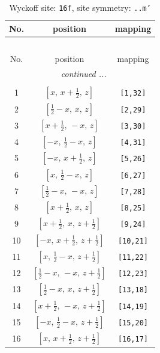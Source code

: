 \documentclass[fleqn,8pt]{jsarticle}
\begin{document}
\renewcommand{\arraystretch}{1.2}
\begin{longtable}{ccc}
\caption{Wyckoff site: {\tt 16f}, site symmetry: {\tt ..m'}}
 \\
 \hline \hline
No. & position & mapping \\ \hline \endfirsthead

\multicolumn{2}{l}{\tablename\ \thetable{}} \\
 \hline \hline
No. & position & mapping \\ \hline \endhead

 \hline \hline
\multicolumn{2}{r}{\footnotesize\it continued ...} \\ \endfoot

 \hline \hline
\multicolumn{2}{r}{} \\ \endlastfoot

1 & $\left[ x,\, x + \frac{1}{2},\, z \right]$ & {\tt [1,32]} \\ \hline
2 & $\left[ \frac{1}{2} - x,\, x,\, z \right]$ & {\tt [2,29]} \\ \hline
3 & $\left[ x + \frac{1}{2},\, - x,\, z \right]$ & {\tt [3,30]} \\ \hline
4 & $\left[ - x,\, \frac{1}{2} - x,\, z \right]$ & {\tt [4,31]} \\ \hline
5 & $\left[ - x,\, x + \frac{1}{2},\, z \right]$ & {\tt [5,26]} \\ \hline
6 & $\left[ x,\, \frac{1}{2} - x,\, z \right]$ & {\tt [6,27]} \\ \hline
7 & $\left[ \frac{1}{2} - x,\, - x,\, z \right]$ & {\tt [7,28]} \\ \hline
8 & $\left[ x + \frac{1}{2},\, x,\, z \right]$ & {\tt [8,25]} \\ \hline
9 & $\left[ x + \frac{1}{2},\, x,\, z + \frac{1}{2} \right]$ & {\tt [9,24]} \\ \hline
10 & $\left[ - x,\, x + \frac{1}{2},\, z + \frac{1}{2} \right]$ & {\tt [10,21]} \\ \hline
11 & $\left[ x,\, \frac{1}{2} - x,\, z + \frac{1}{2} \right]$ & {\tt [11,22]} \\ \hline
12 & $\left[ \frac{1}{2} - x,\, - x,\, z + \frac{1}{2} \right]$ & {\tt [12,23]} \\ \hline
13 & $\left[ \frac{1}{2} - x,\, x,\, z + \frac{1}{2} \right]$ & {\tt [13,18]} \\ \hline
14 & $\left[ x + \frac{1}{2},\, - x,\, z + \frac{1}{2} \right]$ & {\tt [14,19]} \\ \hline
15 & $\left[ - x,\, \frac{1}{2} - x,\, z + \frac{1}{2} \right]$ & {\tt [15,20]} \\ \hline
16 & $\left[ x,\, x + \frac{1}{2},\, z + \frac{1}{2} \right]$ & {\tt [16,17]} \\
\end{longtable}
\end{document}
